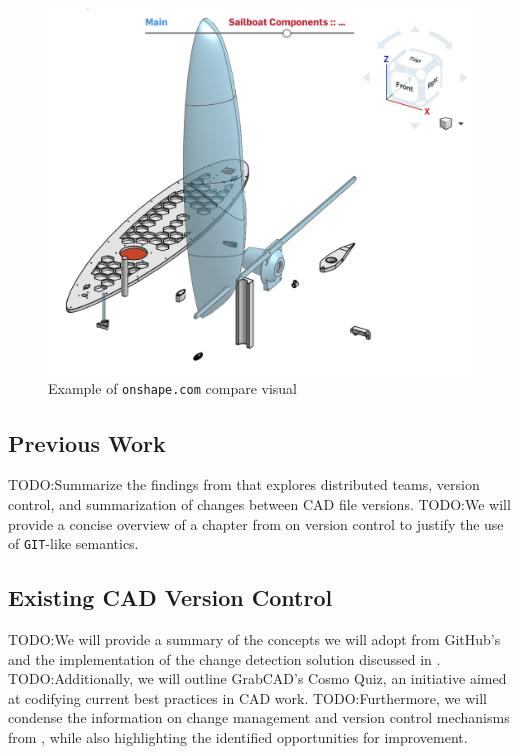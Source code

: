\documentclass[sigconf,authorversion,nonacm]{acmart}
\begin{document}
\begin{figure}[t]
	\includegraphics[width=\linewidth]{onshapescreenshot.png}
	\caption{Example of \texttt{onshape.com} compare visual}
	\label{fig:onshapescreenshot}
\end{figure}

\subsection{Previous Work}

TODO:Summarize the findings from \citet{cheng2023age}  that explores distributed teams, version control, and summarization of changes between CAD file versions.
TODO:We will provide a concise overview of a chapter from \citet{Frazelle_2021} on version control to justify the use of \texttt{GIT}-like semantics.

\subsection{Existing CAD Version Control}

TODO:We will provide a summary of the concepts we will adopt from GitHub's \citet{github_blog_2013} and the implementation of the change detection solution discussed in \citet{3drepo_blog}.
TODO:Additionally, we will outline GrabCAD's Cosmo Quiz\cite{revisions_2014}, an initiative aimed at codifying current best practices in CAD work.
TODO:Furthermore, we will condense the information on change management and version control mechanisms from \citet{Bricogne_Rivest_Troussier_Eynard_2012}, while also highlighting the identified opportunities for improvement.
\end{document}
